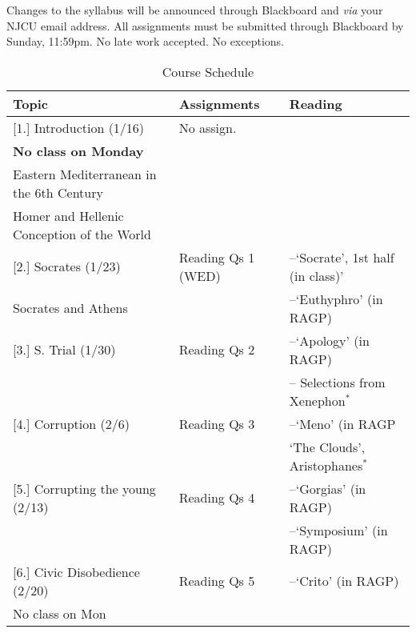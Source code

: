 \documentclass[article,oneside]{memoir}
\begin{document}
 Changes to the syllabus will be announced through Blackboard and \emph{via} your NJCU email address.  All assignments must be submitted through Blackboard by Sunday, 11:59pm. No late work accepted. No exceptions.  

\newpage
\begin{landscape}
\begin{center}
\begin{longtable}{p{8cm}p{4cm}p{8cm}}
 
  \caption{Course Schedule} \\
  \toprule
  \textbf{Topic}   & \textbf{Assignments} & \textbf{Reading} \\
  \midrule

  
[1.] Introduction (1/16) 						& No assign.		&  \\ 
\textbf{No class on Monday}					&				& \\
Eastern Mediterranean in the 6th Century			&				& \\
Homer and Hellenic Conception of the World		 &				&    \\ [1\baselineskip] \midrule

[2.] Socrates (1/23)	  			&  Reading Qs 1 (WED)			& --`Socrate', 1st half (in class)'  \\
Socrates and Athens				&					 & --`Euthyphro'  (in RAGP)  \\ [1\baselineskip] \midrule




[3.] S. Trial (1/30)				& Reading Qs 2		& --`Apology' (in RAGP)  \\ 
							&					& -- Selections from Xenephon$^{*}$\\[1\baselineskip] \midrule


[4.] Corruption (2/6)					& Reading Qs 3		&  --`Meno' (in RAGP \\
			    	    				& 					&  `The Clouds', Aristophanes$^{*}$	 \\ [1\baselineskip] \midrule


[5.] Corrupting the young (2/13)			& Reading Qs 4		&  --`Gorgias' (in RAGP) \\
						      		& 					&  --`Symposium' (in RAGP)  \\ [1\baselineskip]  \midrule


[6.] Civic Disobedience (2/20)			& Reading Qs 5		&  --`Crito' (in RAGP) \\
No class on Mon					& 					&  \\ [1\baselineskip]  \midrule




\end{longtable}
\end{center}
\end{landscape}
\end{document}
